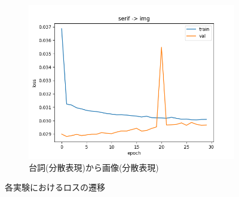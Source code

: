 \documentclass[onecolumn]{ujarticle}   %
\begin{document}
\begin{figure}[hb]
\begin{subfigure}{0.49\columnwidth}
			\includegraphics[width=1.0\columnwidth]{data/MLP_serifimg_loss.png}
			\caption{台詞(分散表現)から画像(分散表現)}
		\end{subfigure}
		\caption{各実験におけるロスの遷移}
		\label{fig:losses}
	\end{figure}
\end{document}
